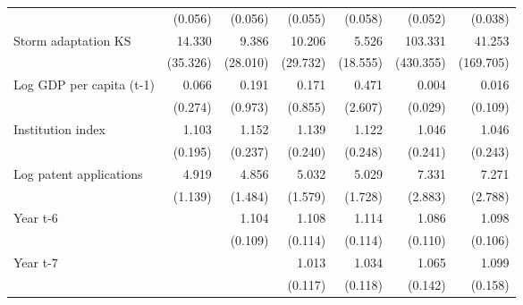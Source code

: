 \begin{table}[htbp]
\begin{tabular}{l*{6}{D{.}{.}{-1}}}
                    &     (0.056)         &     (0.056)         &     (0.055)         &     (0.058)         &     (0.052)         &     (0.038)         \\
\addlinespace
Storm adaptation KS &      14.330         &       9.386         &      10.206         &       5.526         &     103.331         &      41.253         \\
                    &    (35.326)         &    (28.010)         &    (29.732)         &    (18.555)         &   (430.355)         &   (169.705)         \\
\addlinespace
Log GDP per capita (t-1)&       0.066         &       0.191         &       0.171         &       0.471         &       0.004         &       0.016         \\
                    &     (0.274)         &     (0.973)         &     (0.855)         &     (2.607)         &     (0.029)         &     (0.109)         \\
\addlinespace
Institution index   &       1.103         &       1.152         &       1.139         &       1.122         &       1.046         &       1.046         \\
                    &     (0.195)         &     (0.237)         &     (0.240)         &     (0.248)         &     (0.241)         &     (0.243)         \\
\addlinespace
Log patent applications&       4.919\sym{***}&       4.856\sym{***}&       5.032\sym{***}&       5.029\sym{***}&       7.331\sym{***}&       7.271\sym{***}\\
                    &     (1.139)         &     (1.484)         &     (1.579)         &     (1.728)         &     (2.883)         &     (2.788)         \\
\addlinespace
Year t-6            &                     &       1.104         &       1.108         &       1.114         &       1.086         &       1.098         \\
                    &                     &     (0.109)         &     (0.114)         &     (0.114)         &     (0.110)         &     (0.106)         \\
\addlinespace
Year t-7            &                     &                     &       1.013         &       1.034         &       1.065         &       1.099         \\
                    &                     &                     &     (0.117)         &     (0.118)         &     (0.142)         &     (0.158)         \\

\end{tabular}
\end{table}
